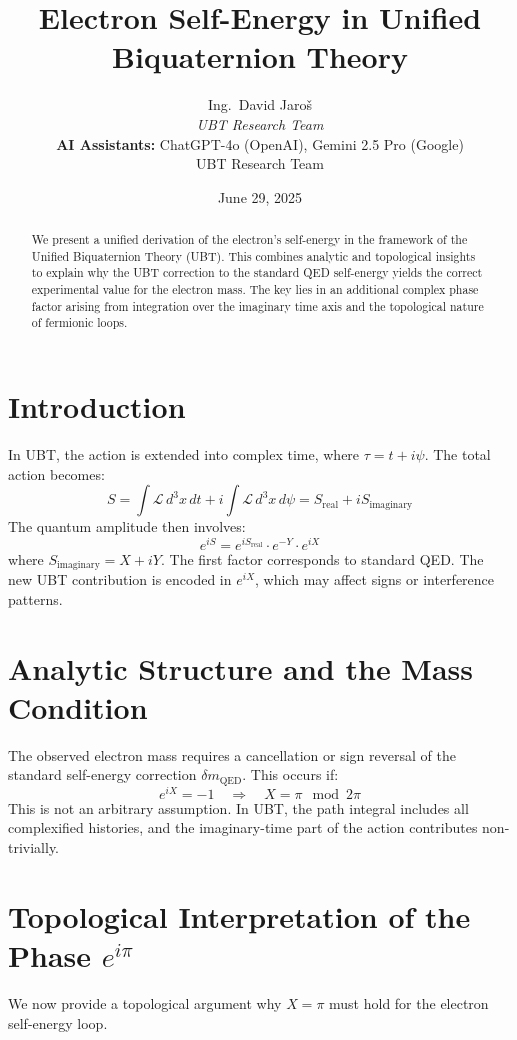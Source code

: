 \documentclass[12pt, a4paper]{article}
\title{\textbf{Electron Self-Energy in Unified Biquaternion Theory}}
\author{
Ing.~David Jaroš \\
\textit{UBT Research Team} \\
\textbf{AI Assistants:} ChatGPT-4o (OpenAI), Gemini 2.5 Pro (Google) \\
UBT Research Team}
\date{June 29, 2025}
\begin{document}
\maketitle

\begin{abstract}
We present a unified derivation of the electron's self-energy in the framework of the Unified Biquaternion Theory (UBT). This combines analytic and topological insights to explain why the UBT correction to the standard QED self-energy yields the correct experimental value for the electron mass. The key lies in an additional complex phase factor arising from integration over the imaginary time axis and the topological nature of fermionic loops.
\end{abstract}

\section{Introduction}

In UBT, the action is extended into complex time, where \( \tau = t + i\psi \). The total action becomes:
\[
S = \int \mathcal{L} \, d^3x\,dt + i \int \mathcal{L} \, d^3x\,d\psi = S_{\text{real}} + i S_{\text{imaginary}}
\]
The quantum amplitude then involves:
\[
e^{iS} = e^{iS_{\text{real}}} \cdot e^{-Y} \cdot e^{iX}
\]
where \( S_{\text{imaginary}} = X + iY \). The first factor corresponds to standard QED. The new UBT contribution is encoded in \( e^{iX} \), which may affect signs or interference patterns.

\section{Analytic Structure and the Mass Condition}

The observed electron mass requires a cancellation or sign reversal of the standard self-energy correction \( \delta m_{\text{QED}} \). This occurs if:
\[
e^{iX} = -1 \quad \Rightarrow \quad X = \pi \mod 2\pi
\]
This is not an arbitrary assumption. In UBT, the path integral includes all complexified histories, and the imaginary-time part of the action contributes non-trivially.

\section{Topological Interpretation of the Phase \( e^{i\pi} \)}

We now provide a topological argument why \( X = \pi \) must hold for the electron self-energy loop.
\end{document}
